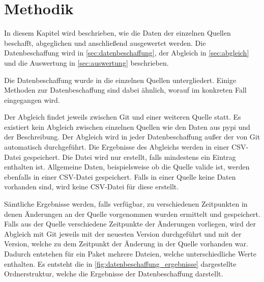 \chapter{Methodik}
\label{chap:methodik}
In diesem Kapitel wird beschrieben, wie die Daten der einzelnen Quellen beschafft, abgeglichen und anschließend ausgewertet werden.
Die Datenbeschaffung wird in \autoref{sec:datenbeschaffung}, der Abgleich in \autoref{sec:abgleich} und die Auswertung in \autoref{sec:auswertung} beschrieben.

Die Datenbeschaffung wurde in die einzelnen Quellen untergliedert.
Einige Methoden zur Datenbeschaffung sind dabei ähnlich, worauf im konkreten Fall eingegangen wird.

Der Abgleich findet jeweils zwischen Git und einer weiteren Quelle statt.
Es existiert kein Abgleich zwischen einzelnen Quellen wie den Daten aus \gls{pypi} und der Beschreibung.
Der Abgleich wird in jeder Datenbeschaffung außer der von Git automatisch durchgeführt.
Die Ergebnisse des Abgleichs werden in einer CSV-Datei gespeichert.
Die Datei wird nur erstellt, falls mindestens ein Eintrag enthalten ist.
Allgemeine Daten, beispielsweise ob die Quelle valide ist, werden ebenfalls in einer CSV-Datei gespeichert.
Falls in einer Quelle keine Daten vorhanden sind, wird keine CSV-Datei für diese erstellt.

Sämtliche Ergebnisse werden, falls verfügbar, zu verschiedenen Zeitpunkten in denen Änderungen an der Quelle vorgenommen wurden ermittelt und gespeichert.
Falls aus der Quelle verschiedene Zeitpunkte der Änderungen vorliegen, wird der Abgleich mit Git jeweils mit der neuesten Version durchgeführt und mit der Version, welche zu dem Zeitpunkt der Änderung in der Quelle vorhanden war.
Dadurch entstehen für ein Paket mehrere Dateien, welche unterschiedliche Werte enthalten.
Es entsteht die in \autoref{fig:datenbeschaffung_ergebnisse} dargestellte Ordnerstruktur, welche die Ergebnisse der Datenbeschaffung darstellt.


